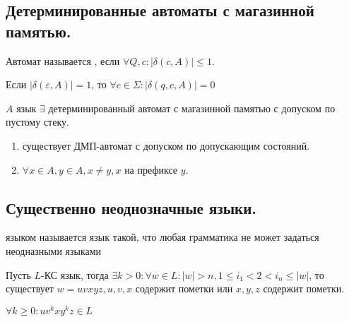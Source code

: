 \subsection{Детерминированные автоматы с магазинной памятью.}

Автомат называется , если $\forall Q,c :|\delta(c,A)|\leq 1$. 

Если $|\delta(\varepsilon,A)|=1$, то $\forall c \in \Sigma: |\delta(q,c,A)| = 0$


$A$ язык $\exists$ детерминированный автомат с магазинной памятью с допуском по пустому стеку.

\begin{enumerate}
    \item существует ДМП-автомат с допуском по допускающим состояний.
    \item $\forall x \in A, y\in A, x \neq y,x$ на префиксе $y$.
\end{enumerate}


\subsection{Существенно неоднозначные языки.}

 языком называется язык такой, что любая грамматика не может задаться неодназными языками


Пусть $L$-КС язык, тогда $\exists k  >0: \forall w \in L: |w|  >n, 1\leq i_1<2<i_n\leq |w|$, то существует $w = uvxyz, u,v,x$ содержит пометки или $x,y,z$ содержит пометки.

$\forall k \geq 0: uv ^kxy^kz \in L$